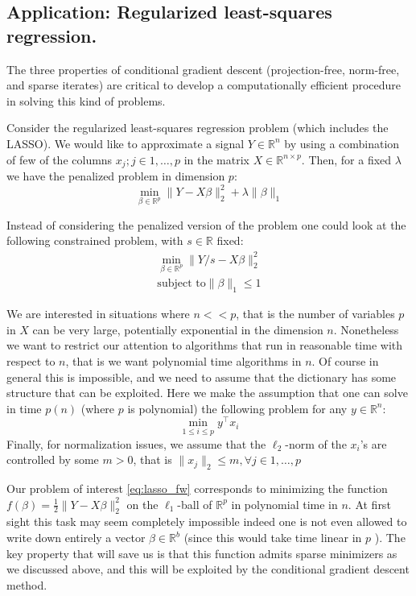 \subsection{Application: Regularized least-squares regression.}
The three properties of conditional gradient descent (projection-free, norm-free, and sparse iterates) are critical to develop a computationally efficient procedure in solving this kind of problems.

Consider the regularized least-squares regression problem (which includes the LASSO). We would like to approximate a signal $Y \in \mathbb{R}^n$ by using a combination of few of the columns $x_j; j\in 1,\ldots,p$ in the matrix $X \in \mathbb{R}^{n \times p}$. Then, for a fixed $\lambda$ we have the penalized problem in dimension $p$:
\begin{equation}
\min_{\beta \in \mathbb{R}^p} \| Y - X \beta \|_2^2 + \lambda \|\beta\|_1 \nonumber
\end{equation}

Instead of considering the penalized version of the problem one could look at the following constrained problem, with $s \in \mathbb{R}$ fixed:
\begin{align} \label{eq:lasso_fw}
\min_{\beta \in \mathbb{R}^p} \| Y/s - X \beta \|_2^2 \\
\text{subject to} \|\beta\|_1 \leq 1 \nonumber
\end{align}

We are interested in situations where $n<<p$, that is the number of variables $p$ in $X$ can be very large, potentially exponential in the dimension $n$. Nonetheless we want to restrict our attention to algorithms that run in reasonable time with respect to $n$, that is we want polynomial time algorithms in $n$. Of course in general this is impossible, and we need to assume that the dictionary has some structure that can be exploited. Here we make the assumption that one can solve in time $p(n)$ (where $p$ is polynomial) the following problem for any $y\in\mathbb{R}^n$:
\begin{equation}
\min_{ 1\leq i \leq p } y^{\top} x_i\nonumber
\end{equation}
Finally, for normalization issues, we assume that the $\ell_2$-norm of the $x_i$'s are controlled by some $m > 0$, that is $\| x_j \|_2 \leq m, \forall j \in 1,\ldots,p $

Our problem of interest \ref{eq:lasso_fw} corresponds to minimizing the function $f(\beta) = \frac{1}{2}\| Y - X \beta \|_2^2 $ on the $\ell_1$-ball of $\mathbb{R}^p$ in polynomial time in $n$. At first sight this task may seem completely impossible indeed one is not even allowed to write down entirely a vector $\beta \in \mathbb{R}^b$ (since this would take time linear in $p$ ). The key property that will save us is that this function admits sparse minimizers as we discussed above, and this will be exploited by the conditional gradient descent method.

